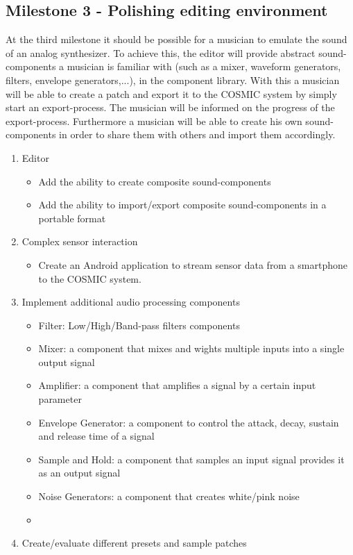 \subsection{Milestone 3 - Polishing editing environment}

At the third milestone it should be possible for a musician to emulate the sound of an analog synthesizer. To achieve this, the editor will provide abstract sound-components a musician is familiar with (such as a mixer, waveform generators, filters, envelope generators,...), in the component library. With this a  musician will be able to create a patch and export it to the \ac{COSMIC} system by simply start an export-process. The musician will be informed on the progress of the export-process. Furthermore a musician will be able to create his own sound-components in order to share them with others and import them accordingly.

	\begin{enumerate}
		\item Editor
			\begin{itemize}
				\item Add the ability to create composite sound-components
				\item Add the ability to import/export composite sound-components in a portable format
			\end{itemize}
		\item Complex sensor interaction
			\begin{itemize}
				\item Create an Android application to stream sensor data from a smartphone to the \ac{COSMIC} system.
			\end{itemize}
		\item Implement additional audio processing components	
			\begin{itemize}
				\item Filter: Low/High/Band-pass filters components
				\item Mixer: a component that mixes and wights multiple inputs into a single output signal
				\item Amplifier: a component that amplifies a signal by a certain input parameter
				\item Envelope Generator: a component to control the attack, decay, sustain and release time of a signal
				\item Sample and Hold: a component that samples an input signal provides it as an output signal
				\item Noise Generators: a component that creates white/pink noise
				\item 
			\end{itemize}
		\item Create/evaluate different presets and sample patches
	\end{enumerate}
	
